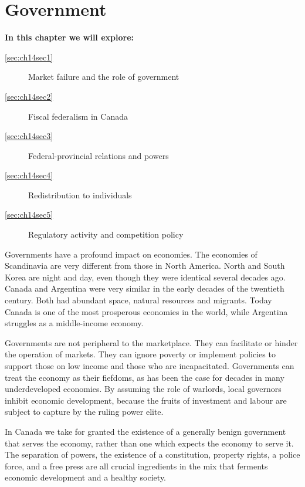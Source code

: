 \chapter{Government}\label{chap:government}

\begin{topics}
	\textbf{In this chapter we will explore:}
	\begin{description}
		\item[\ref{sec:ch14sec1}] Market failure and the role of government
		\item[\ref{sec:ch14sec2}] Fiscal federalism in Canada
		\item[\ref{sec:ch14sec3}] Federal-provincial relations and powers
		\item[\ref{sec:ch14sec4}] Redistribution to individuals
		\item[\ref{sec:ch14sec5}] Regulatory activity and competition policy
	\end{description}
\end{topics}

Governments have a profound impact on economies. The economies of
Scandinavia are very different from those in North America. North and South
Korea are night and day, even though they were identical several decades
ago. Canada and Argentina were very similar in the early decades of the
twentieth century. Both had abundant space, natural resources and migrants.
Today Canada is one of the most prosperous economies in the world, while
Argentina struggles as a middle-income economy.

Governments are not peripheral to the marketplace. They can facilitate or
hinder the operation of markets. They can ignore poverty or implement
policies to support those on low income and those who are incapacitated.
Governments can treat the economy as their fiefdoms, as has been the case
for decades in many underdeveloped economies. By assuming the role of
warlords, local governors inhibit economic development, because the fruits
of investment and labour are subject to capture by the ruling power elite.

In Canada we take for granted the existence of a generally benign government
that serves the economy, rather than one which expects the economy to serve
it. The separation of powers, the existence of a constitution, property
rights, a police force, and a free press are all crucial ingredients in the
mix that ferments economic development and a healthy society.

